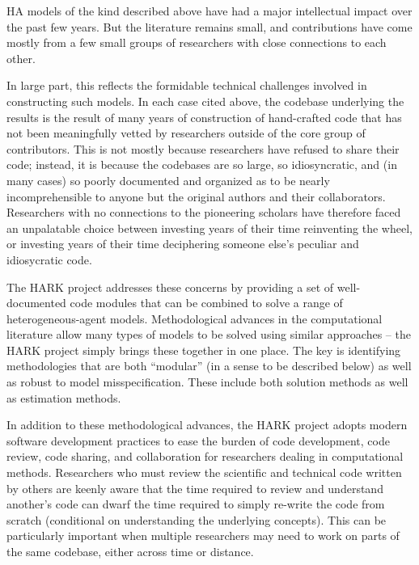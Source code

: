 \documentclass[10pt,twocolumn]{article}
\begin{document}
HA models of the kind described above have had a major intellectual impact over the past few years. But the literature remains small, and contributions have come mostly from a few small groups of researchers with close connections to each other.

In large part, this reflects the formidable technical challenges involved in constructing such models. In each case cited above, the codebase underlying the results is the result of many years of construction of hand-crafted code that has not been meaningfully vetted by researchers outside of the core group of contributors.  This is not mostly because researchers have refused to share their code; instead, it is because the codebases are so large, so idiosyncratic, and (in many cases) so poorly documented and organized as to be nearly incomprehensible to anyone but the original authors and their collaborators.  Researchers with no connections to the pioneering scholars have therefore faced an unpalatable choice between investing years of their time reinventing the wheel, or investing years of their time deciphering someone else's peculiar and idiosycratic code.

The HARK project addresses these concerns by providing a set of well-documented code modules that can be combined to solve a range of heterogeneous-agent models. Methodological advances in the computational literature allow many types of models to be solved using similar approaches -- the HARK project simply brings these together in one place. The key is identifying methodologies that are both ``modular'' (in a sense to be described below) as well as robust to model misspecification. These include both solution methods as well as estimation methods.

In addition to these methodological advances, the HARK project adopts modern software development practices to ease the burden of code development, code review, code sharing, and collaboration for researchers dealing in computational methods. Researchers who must review the scientific and technical code written by others are keenly aware that the time required to review and understand another's code can dwarf the time required to simply re-write the code from scratch (conditional on understanding the underlying concepts). This can be particularly important when multiple researchers may need to work on parts of the same codebase, either across time or distance.
\end{document}
